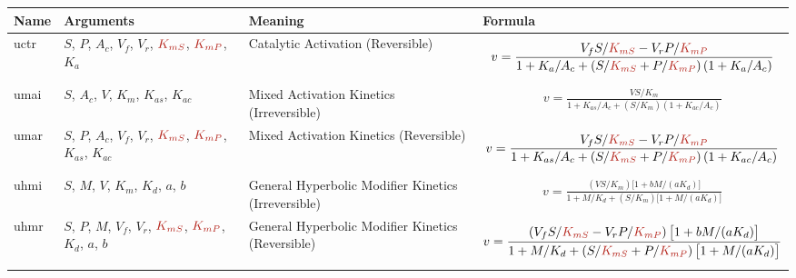 \documentclass[10pt]{cekarticle}
\newcommand{\changed}[1]{\textcolor{BrickRed}{#1}}
\newenvironment{blockChanged}{\color{BrickRed}}{}
\begin{document}
\addtocounter{table}{-1}
\begin{table}[ht]
\setlength{\abovedisplayskip}{-2pt}
\setlength{\belowdisplayskip}{1pt}
\begin{tabular}{|p{0.45in}|>{\raggedright}m{0.77in}|>{\raggedright}m{1.1in}|m{3.45in}|}
\hline
\textbf{Name} & \textbf{Arguments} & \textbf{Meaning} & \textbf{Formula} \\
\hline

uctr & $S$, $P$, $A_c$, $V_f$, $V_r$, $\changed{K_{mS}}$, $\changed{K_{mP}}$, $K_a$ &
Catalytic Activation (Reversible) &
\begin{gather*}
v = \frac{V_f S/\changed{K_{mS}} - V_r P/\changed{K_{mP}}}{1 +
K_a/A_c + \left( S/\changed{K_{mS}} + P/\changed{K_{mP}}\right) \left( 1 + K_a/A_c\right)}
\end{gather*}
\\ \hline

umai & $S$, $A_c$, $V$, $K_m$, \changed{$K_{as}$}, \changed{$K_{ac}$} & Mixed Activation
Kinetics (Irreversible) &
\begin{blockChanged}
\begin{gather*}
v = \frac{V S/K_m}{1 + K_{as}/A_c + \left( S/K_m \right) \left( 1 + K_{ac}/A_c\right)}
\end{gather*}
\end{blockChanged}
\\ \hline

umar & $S$, $P$, $A_c$, $V_f$, $V_r$, $\changed{K_{mS}}$, $\changed{K_{mP}}$, $K_{as}$, $K_{ac}$ &
Mixed Activation Kinetics (Reversible) &
\begin{gather*}
v = \frac{V_f S/\changed{K_{mS}} - V_r P/\changed{K_{mP}}}{1 + K_{as}/A_c + \left( S/\changed{K_{mS}} +
    P/\changed{K_{mP}}\right) \left( 1 + K_{ac}/A_c\right)}
\end{gather*}
\\ \hline

uhmi & $S$, $M$, $V$, $K_m$, $K_d$, $a$, $b$ & General Hyperbolic
Modifier Kinetics (Irreversible) &
\begin{blockChanged}
\begin{gather*}
v = \frac{(V S/K_m) \bigl[ 1 + b M / (a K_d)\bigr] }{1 + M/K_d + ( S/K_m ) \bigl[ 1 + M/(a K_d)\bigr]}
\end{gather*}
\end{blockChanged}
\\ \hline

uhmr & $S$, $P$, $M$, $V_f$, $V_r$, $\changed{K_{mS}}$, $\changed{K_{mP}}$, $K_d$, $a$, $b$ &
General Hyperbolic Modifier Kinetics (Reversible) &
\begin{gather*}
v = \frac{\left( V_f S/\changed{K_{mS}} - V_r P/\changed{K_{mP}}\right) \bigl[ 1 + b M / (a
K_d)\bigr] }{1 + M/K_d + \left( S/\changed{K_{mS}} + P/\changed{K_{mP}} \right) \bigl[ 1 +
M/(a K_d)\bigr]}
\end{gather*}
\\ \hline


\end{tabular}
\end{table}
\end{document}
